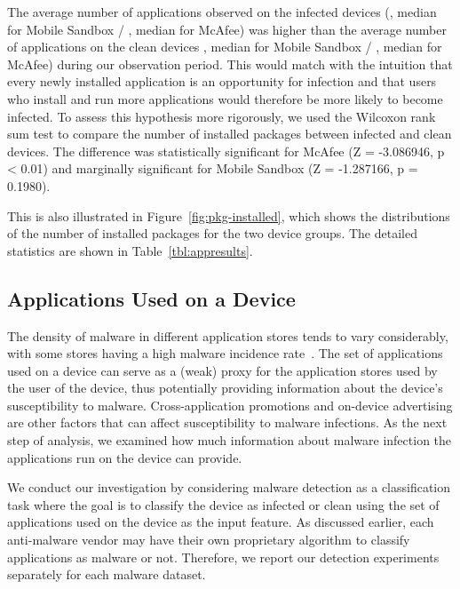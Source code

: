 The average number of applications observed on the infected devices
(, median  for Mobile Sandbox / , median  for McAfee) was higher than the average number of applications on the clean devices
, median  for Mobile Sandbox / , median  for McAfee) during our observation period. This would match with the
intuition that every newly installed application is an opportunity for
infection and that users who install and run more applications would therefore
be more likely to become infected. To assess this hypothesis more
rigorously, we used the Wilcoxon rank sum test to compare the number of installed
packages between infected and clean devices. The
difference was statistically significant for McAfee (Z = -3.086946, p < 0.01) and marginally significant for Mobile Sandbox (Z = -1.287166, p = 0.1980).
 
This is also illustrated in Figure~\ref{fig:pkg-installed}, which
shows the distributions of the number of installed packages for the
two device groups.  The detailed statistics are shown in
Table~\ref{tbl:appresults}.
\fi



\subsection{Applications Used on a Device}
\label{subsec:predictions:applications}




The density of malware in different application stores tends to vary
considerably, with some stores having a high malware incidence
rate~\cite{yajin_zhou_hey_2012}. The set of applications used on a
device can serve as a (weak) proxy for the application stores used by
the user of the device, thus potentially providing information about
the device's susceptibility to malware. Cross-application promotions
and on-device advertising are other factors that can affect
susceptibility to malware infections. As the next step of analysis, we
examined how much information about malware infection the applications
run on the device can provide.

We conduct our investigation by considering malware detection as a
classification task where the goal is to classify the device as
infected or clean using the set of applications used on the
device as the input feature. As discussed earlier, each anti-malware
vendor may have their own proprietary algorithm to classify
applications as malware or not.  Therefore, we report our detection
experiments separately for each malware dataset.

